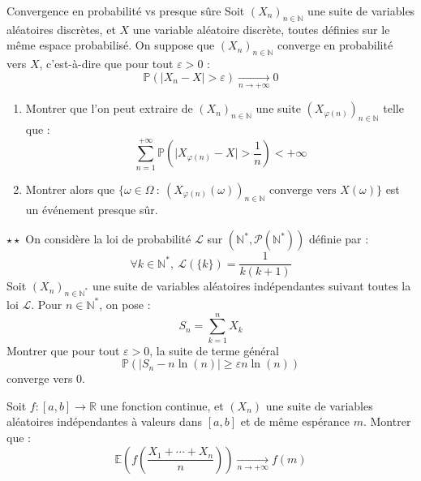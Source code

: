 \documentclass[french,a4paper]{article}
\renewcommand{\P}{\mathbb{P}}
\newcommand{\N}{\mathbb{N}}
\newcommand{\R}{\mathbb{R}}
\newcommand{\st}{^*}
\newcommand{\E}{\mathbb{E}}
\theoremstyle{plain}
\theoremstyle{definition}
\theoremstyle{remark}
\begin{document}
\begin{ex}{Convergence en probabilité vs presque sûre}
	Soit $(X_n)_{n\in\N}$ une suite de variables aléatoires discrètes, et $X$ une variable aléatoire discrète, toutes définies sur le même espace probabilisé. On suppose que $(X_n)_{n\in\N}$ converge en probabilité vers $X$, c'est-à-dire que pour tout $\varepsilon>0$ : $$\P(\lvert X_n-X\rvert>\varepsilon)\xrightarrow[n\to+\infty]{}0$$
	\begin{enumerate}
		\item Montrer que l'on peut extraire de $(X_n)_{n\in\N}$ une suite $(X_{\varphi(n)})_{n\in\N}$ telle que : $$\sum_{n=1}^{+\infty}\P\left(\lvert X_{\varphi(n)}-X\rvert>\frac{1}{n}\right)<+\infty$$
		\item Montrer alors que $\{\omega\in\Omega\ : \ (X_{\varphi(n)}(\omega))_{n\in\N}\text{ converge vers }X(\omega)\}$ est un événement presque sûr.
	\end{enumerate}
\end{ex}

\begin{ex}{$\star\star$}
	On considère la loi de probabilité $\mathcal{L}$ sur $(\N\st,\mathcal{P}(\N\st))$ définie par : $$\forall k\in\N\st,\ \mathcal{L}(\{k\})=\frac{1}{k(k+1)}$$ Soit $(X_n)_{n\in\N\st}$ une suite de variables aléatoires indépendantes suivant toutes la loi $\mathcal{L}$. Pour $n\in\N\st$, on pose : $$S_n=\sum_{k=1}^{n}X_k$$ Montrer que pour tout $\varepsilon>0$, la suite de terme général $$\P(\lvert S_n-n\ln(n)\rvert\geqslant\varepsilon n\ln(n))$$ converge vers $0$.
\end{ex}

\begin{ex}{}
	Soit $f:[a,b]\to\R$ une fonction continue, et $(X_n)$ une suite de variables aléatoires indépendantes à valeurs dans $[a,b]$ et de même espérance $m$. Montrer que : $$\E\left(f\left(\frac{X_1+\cdots+X_n}{n}\right)\right)\xrightarrow[n\to+\infty]{}f(m)$$
\end{ex}
\end{document}
